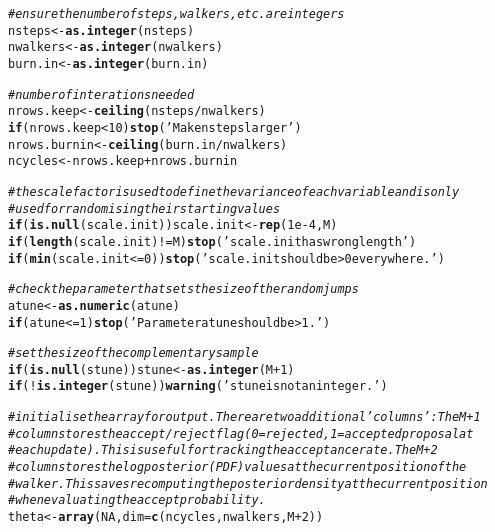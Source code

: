\documentclass{article}\usepackage[]{graphicx}\usepackage[]{color}
\makeatletter
\newcommand{\hlnum}[1]{\textcolor[rgb]{0.686,0.059,0.569}{#1}}%
\newcommand{\hlstr}[1]{\textcolor[rgb]{0.192,0.494,0.8}{#1}}%
\newcommand{\hlcom}[1]{\textcolor[rgb]{0.678,0.584,0.686}{\textit{#1}}}%
\newcommand{\hlopt}[1]{\textcolor[rgb]{0,0,0}{#1}}%
\newcommand{\hlstd}[1]{\textcolor[rgb]{0.345,0.345,0.345}{#1}}%
\newcommand{\hlkwa}[1]{\textcolor[rgb]{0.161,0.373,0.58}{\textbf{#1}}}%
\newcommand{\hlkwb}[1]{\textcolor[rgb]{0.69,0.353,0.396}{#1}}%
\newcommand{\hlkwc}[1]{\textcolor[rgb]{0.333,0.667,0.333}{#1}}%
\newcommand{\hlkwd}[1]{\textcolor[rgb]{0.737,0.353,0.396}{\textbf{#1}}}%
\newenvironment{kframe}{%
 \def\at@end@of@kframe{}%
 \ifinner\ifhmode%
  \def\at@end@of@kframe{\end{minipage}}%
  \begin{minipage}{\columnwidth}%
 \fi\fi%
 \def\FrameCommand##1{\hskip\@totalleftmargin \hskip-\fboxsep
 \colorbox{shadecolor}{##1}\hskip-\fboxsep
     \hskip-\linewidth \hskip-\@totalleftmargin \hskip\columnwidth}%
 \MakeFramed {\advance\hsize-\width
   \@totalleftmargin\z@ \linewidth\hsize
   \@setminipage}}%
 {\par\unskip\endMakeFramed%
 \at@end@of@kframe}
\newenvironment{knitrout}{}{} %
\makeatother
\begin{document}
\begin{knitrout}
\begin{kframe}
\begin{alltt}
  \hlcom{# ensure the number of steps, walkers, etc. are integers  }
  \hlstd{nsteps} \hlkwb{<-} \hlkwd{as.integer}\hlstd{(nsteps)}
  \hlstd{nwalkers} \hlkwb{<-} \hlkwd{as.integer}\hlstd{(nwalkers)}
  \hlstd{burn.in} \hlkwb{<-} \hlkwd{as.integer}\hlstd{(burn.in)}

  \hlcom{# number of interations needed}
  \hlstd{nrows.keep} \hlkwb{<-} \hlkwd{ceiling}\hlstd{(nsteps} \hlopt{/} \hlstd{nwalkers)}
  \hlkwa{if} \hlstd{(nrows.keep} \hlopt{<} \hlnum{10}\hlstd{)} \hlkwd{stop}\hlstd{(}\hlstr{'Make nsteps larger'}\hlstd{)}
  \hlstd{nrows.burnin} \hlkwb{<-} \hlkwd{ceiling}\hlstd{(burn.in} \hlopt{/} \hlstd{nwalkers)}
  \hlstd{ncycles} \hlkwb{<-} \hlstd{nrows.keep} \hlopt{+} \hlstd{nrows.burnin}

  \hlcom{# the scale factor is used to define the variance of each variable and is only}
  \hlcom{# used for randomising their starting values}
  \hlkwa{if} \hlstd{(}\hlkwd{is.null}\hlstd{(scale.init)) scale.init} \hlkwb{<-} \hlkwd{rep}\hlstd{(}\hlnum{1e-4}\hlstd{, M)}
  \hlkwa{if} \hlstd{(}\hlkwd{length}\hlstd{(scale.init)} \hlopt{!=} \hlstd{M)} \hlkwd{stop}\hlstd{(}\hlstr{'scale.init has wrong length'}\hlstd{)}
  \hlkwa{if} \hlstd{(}\hlkwd{min}\hlstd{(scale.init} \hlopt{<=} \hlnum{0}\hlstd{))} \hlkwd{stop}\hlstd{(}\hlstr{'scale.init should be >0 everywhere.'}\hlstd{)}

  \hlcom{# check the parameter that sets the size of the random jumps}
  \hlstd{atune} \hlkwb{<-} \hlkwd{as.numeric}\hlstd{(atune)}
  \hlkwa{if} \hlstd{(atune} \hlopt{<=} \hlnum{1}\hlstd{)} \hlkwd{stop}\hlstd{(}\hlstr{'Parameter atune should be >1.'}\hlstd{)}

  \hlcom{# set the size of the complementary sample}
  \hlkwa{if} \hlstd{(}\hlkwd{is.null}\hlstd{(stune)) stune} \hlkwb{<-} \hlkwd{as.integer}\hlstd{( M}\hlopt{+}\hlnum{1} \hlstd{)}
  \hlkwa{if} \hlstd{(}\hlopt{!}\hlkwd{is.integer}\hlstd{(stune))} \hlkwd{warning}\hlstd{(}\hlstr{'stune is not an integer.'}\hlstd{)}

  \hlcom{# initialise the array for output. There are two additional 'columns': The M+1}
  \hlcom{# column stores the accept/reject flag (0=rejected, 1=accepted proposal at }
  \hlcom{# each update). This is useful for tracking the acceptance rate. The M+2 }
  \hlcom{# column stores the log posterior (PDF) values at the current position of the }
  \hlcom{# walker. This saves recomputing the posterior density at the current position}
  \hlcom{# when evaluating the accept probability.}
  \hlstd{theta} \hlkwb{<-} \hlkwd{array}\hlstd{(}\hlnum{NA}\hlstd{,} \hlkwc{dim}\hlstd{=}\hlkwd{c}\hlstd{(ncycles, nwalkers, M}\hlopt{+}\hlnum{2}\hlstd{))}


\end{alltt}
\end{kframe}
\end{knitrout}
\end{document}

